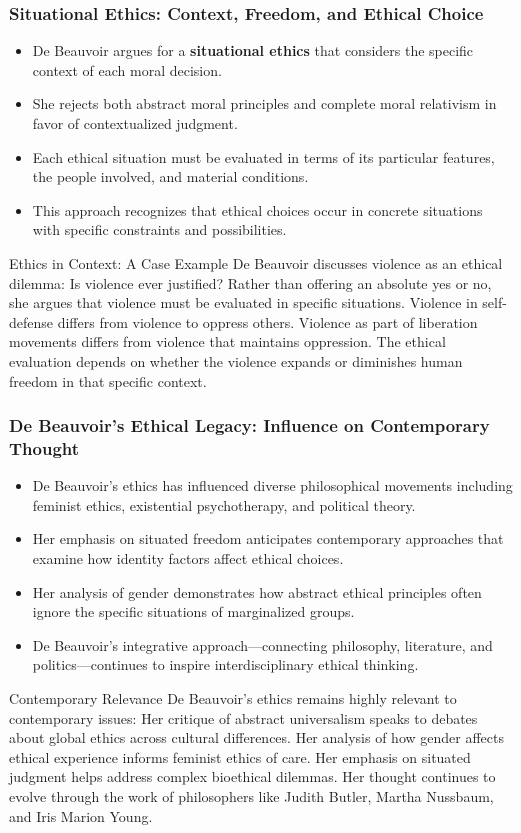 \documentclass[aspectratio=169]{beamer}
\begin{document}
	\begin{frame}
		\frametitle{Situational Ethics: Context, Freedom, and Ethical Choice}
		\begin{itemize}
			\item De Beauvoir argues for a \textbf{situational ethics} that considers the specific context of each moral decision.
			\item She rejects both abstract moral principles and complete moral relativism in favor of contextualized judgment.
			\item Each ethical situation must be evaluated in terms of its particular features, the people involved, and material conditions.
			\item This approach recognizes that ethical choices occur in concrete situations with specific constraints and possibilities.
		\end{itemize}
		
		\begin{exampleblock}{Ethics in Context: A Case Example}
			De Beauvoir discusses violence as an ethical dilemma: Is violence ever justified? Rather than offering an absolute yes or no, she argues that violence must be evaluated in specific situations. Violence in self-defense differs from violence to oppress others. Violence as part of liberation movements differs from violence that maintains oppression. The ethical evaluation depends on whether the violence expands or diminishes human freedom in that specific context.
		\end{exampleblock}
	\end{frame}
	
	\begin{frame}
		\frametitle{De Beauvoir's Ethical Legacy: Influence on Contemporary Thought}
		\begin{itemize}
			\item De Beauvoir's ethics has influenced diverse philosophical movements including feminist ethics, existential psychotherapy, and political theory.
			\item Her emphasis on situated freedom anticipates contemporary approaches that examine how identity factors affect ethical choices.
			\item Her analysis of gender demonstrates how abstract ethical principles often ignore the specific situations of marginalized groups.
			\item De Beauvoir's integrative approach—connecting philosophy, literature, and politics—continues to inspire interdisciplinary ethical thinking.
		\end{itemize}
		
		\begin{alertblock}{Contemporary Relevance}
			De Beauvoir's ethics remains highly relevant to contemporary issues: Her critique of abstract universalism speaks to debates about global ethics across cultural differences. Her analysis of how gender affects ethical experience informs feminist ethics of care. Her emphasis on situated judgment helps address complex bioethical dilemmas. Her thought continues to evolve through the work of philosophers like Judith Butler, Martha Nussbaum, and Iris Marion Young.
		\end{alertblock}
	\end{frame}
\end{document}

